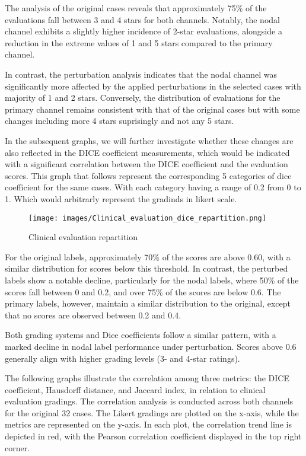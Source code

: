 The analysis of the original cases reveals that approximately 75\% of the evaluations fall between 3 and 4 stars for both channels. Notably, the nodal channel exhibits a slightly higher incidence of 2-star evaluations, alongside a reduction in the extreme values of 1 and 5 stars compared to the primary channel.

In contrast, the perturbation analysis indicates that the nodal channel was significantly more affected by the applied perturbations in the selected cases with majority of 1 and 2 stars. Conversely, the distribution of evaluations for the primary channel remains consistent with that of the original cases but with some changes including more 4 stars suprisingly and not any 5 stars.

In the subsequent graphs, we will further investigate whether these changes are also reflected in the DICE coefficient measurements, which would be indicated with a significant correlation between the DICE coefficient and the evaluation scores.
\newpage
This graph that follows represent the corresponding 5 categories of dice coefficient for the same cases. With each category having a range of 0.2 from 0 to 1.
Which would arbitrarly represent the gradinds in likert scale.
\begin{figure}[ht]
    \centering
    \texttt{[image: images/Clinical\_evaluation\_dice\_repartition.png]}
    \caption{Clinical evaluation repartition}
    \label{fig:three_subfigures}
\end{figure}

For the original labels, approximately 70\% of the scores are above 0.60, with a similar distribution for scores below this threshold. In contrast, the perturbed labels show a notable decline, particularly for the nodal labels, where 50\% of the scores fall between 0 and 0.2, and over 75\% of the scores are below 0.6. The primary labels, however, maintain a similar distribution to the original, except that no scores are observed between 0.2 and 0.4.

Both grading systems and Dice coefficients follow a similar pattern, with a marked decline in nodal label performance under perturbation. Scores above 0.6 generally align with higher grading levels (3- and 4-star ratings).

\newpage
The following graphs illustrate the correlation among three metrics: the DICE coefficient, Hausdorff distance, and Jaccard index, 
in relation to clinical evaluation gradings. The correlation analysis is conducted across both channels for the original 32 cases. 
The Likert gradings are plotted on the x-axis, while the metrics are represented on the y-axis. In each plot, the correlation trend 
line is depicted in red, with the Pearson correlation coefficient displayed in the top right corner.

